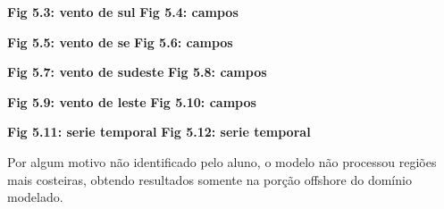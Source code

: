 \documentclass[11pt]{article}
\begin{document}
\textbf{Fig 5.3: vento de sul} \textbf{Fig 5.4: campos}

\textbf{Fig 5.5: vento de se} \textbf{Fig 5.6: campos}

\textbf{Fig 5.7: vento de sudeste} \textbf{Fig 5.8: campos}

\textbf{Fig 5.9: vento de leste} \textbf{Fig 5.10: campos}

\textbf{Fig 5.11: serie temporal} \textbf{Fig 5.12: serie temporal}

Por algum motivo não identificado pelo aluno, o modelo não processou
regiões mais costeiras, obtendo resultados somente na porção offshore do
domínio modelado.





    
\end{document}
